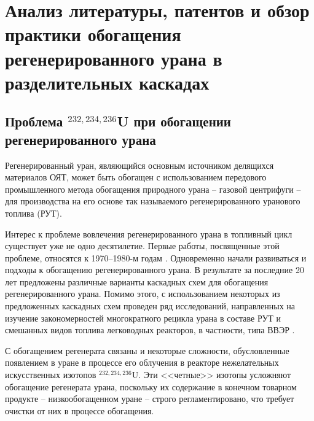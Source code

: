 \chapter{Анализ литературы, патентов и обзор практики обогащения регенерированного урана в разделительных каскадах}\label{ch1}

\section{Проблема $^{232,234,236}$U при обогащении регенерированного урана}

Регенерированный уран, являющийся основным источником делящихся материалов ОЯТ, может быть обогащен с использованием передового промышленного метода обогащения природного урана -- газовой центрифуги -- для производства на его основе так называемого регенерированного уранового топлива (РУТ).

Интерес к проблеме вовлечения регенерированного урана в топливный цикл существует уже не одно десятилетие. Первые работы, посвященные этой проблеме, относятся к 1970–1980-м годам \cite{kazukihidaSimultaneousEvaluationEffects1986,sidenkoIssledovanieKaskadnyhShem,delagarzaUranium236LightWater1977,ксенофонтовИсследованиеПроблемыВовлечения1988,borodynyaIssledovanieProblemyVovlecheniya1989,raysIzgotovlenieOksidnogoTopliva1994,zhiroEkonomicheskiePreimushchestvaPererabotki1997,lebedevZamknutyyToplivnyyCikl1999,psheninZaklyuchitelnyyOtchetNIR2012}. Одновременно начали развиваться и подходы к обогащению регенерированного урана. В результате за последние 20 лет предложены различные варианты каскадных схем для обогащения регенерированного урана. Помимо этого, с использованием некоторых из предложенных каскадных схем проведен ряд исследований, направленных на изучение закономерностей многократного рецикла урана в составе РУТ и смешанных видов топлива легководных реакторов, в частности, типа ВВЭР \cite{smirnovEvolutionIsotopicComposition2012,kazukihidaSimultaneousEvaluationEffects1986,blandinskiySoglasovannyyPodhodModelirovaniyu2018,colemanEvaluationMultipleSelfrecycling2010}. 

С обогащением регенерата связаны и некоторые сложности, обусловленные появлением в уране в процессе его облучения в реакторе нежелательных искусственных изотопов $^{232,234,236}$U. Эти <<четные>> изотопы усложняют обогащение регенерата урана, поскольку их содержание в конечном товарном продукте -- низкообогащенном уране -- строго регламентировано, что требует очистки от них в процессе обогащения.

